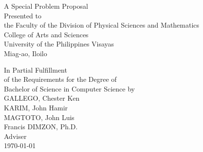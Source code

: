 \begin{titlepage}
\centering


\vspace{1.75cm}
A Special Problem Proposal\\
Presented to\\
the Faculty of the Division of Physical Sciences and Mathematics\\
College of Arts and Sciences\\
University of the Philippines Visayas\\
Miag-ao, Iloilo

\vspace{1.75cm}
In Partial Fulfillment\\
of the Requirements for the Degree of\\
Bachelor of Science in Computer Science
\vspace{1.75cm}
by\\

\vspace{1cm}
GALLEGO, Chester Ken  \\
KARIM, John Hamir  \\
MAGTOTO, John Luis  \\

\vspace{1.75cm}
Francis DIMZON, Ph.D. \\
Adviser\\

\vspace{1.75cm}
\today
\end{titlepage}
